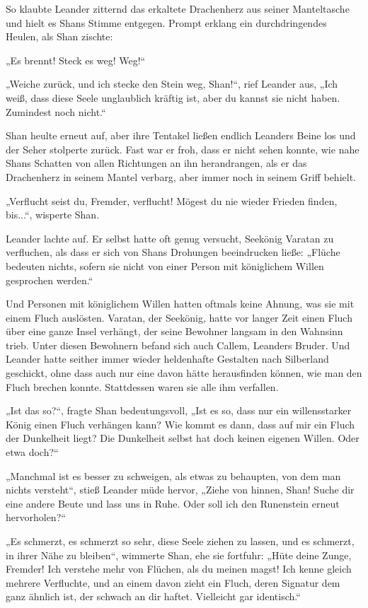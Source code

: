 So klaubte Leander zitternd das erkaltete Drachenherz aus seiner Manteltasche und hielt es Shans Stimme entgegen. Prompt erklang ein durchdringendes Heulen, als Shan zischte:

„Es brennt! Steck es weg! Weg!“

„Weiche zurück, und ich stecke den Stein weg, Shan!“, rief Leander aus, „Ich weiß, dass diese Seele unglaublich kräftig ist, aber du kannst sie nicht haben. Zumindest noch nicht.“

Shan heulte erneut auf, aber ihre Tentakel ließen endlich Leanders Beine los und der Seher stolperte zurück. Fast war er froh, dass er nicht sehen konnte, wie nahe Shans Schatten von allen Richtungen an ihn herandrangen, als er das Drachenherz in seinem Mantel verbarg, aber immer noch in seinem Griff behielt.

„Verflucht seist du, Fremder, verflucht! Mögest du nie wieder Frieden finden, bis...“, wisperte Shan.

Leander lachte auf. Er selbst hatte oft genug versucht, Seekönig Varatan zu verfluchen, als dass er sich von Shans Drohungen beeindrucken ließe: „Flüche bedeuten nichts, sofern sie nicht von einer Person mit königlichem Willen gesprochen werden.“

Und Personen mit königlichem Willen hatten oftmals keine Ahnung, was sie mit einem Fluch auslösten. Varatan, der Seekönig, hatte vor langer Zeit einen Fluch über eine ganze Insel verhängt, der seine Bewohner langsam in den Wahnsinn trieb. Unter diesen Bewohnern befand sich auch Callem, Leanders Bruder. Und Leander hatte seither immer wieder heldenhafte Gestalten nach Silberland geschickt, ohne dass auch nur eine davon hätte herausfinden können, wie man den Fluch brechen konnte. Stattdessen waren sie alle ihm verfallen.

„Ist das so?“, fragte Shan bedeutungsvoll, „Ist es so, dass nur ein willensstarker König einen Fluch verhängen kann? Wie kommt es dann, dass auf mir ein Fluch der Dunkelheit liegt? Die Dunkelheit selbst hat doch keinen eigenen Willen. Oder etwa doch?“

„Manchmal ist es besser zu schweigen, als etwas zu behaupten, von dem man nichts versteht“, stieß Leander müde hervor, „Ziehe von hinnen, Shan! Suche dir eine andere Beute und lass uns in Ruhe. Oder soll ich den Runenstein erneut hervorholen?“

„Es schmerzt, es schmerzt so sehr, diese Seele ziehen zu lassen, und es schmerzt, in ihrer Nähe zu bleiben“, wimmerte Shan, ehe sie fortfuhr: „Hüte deine Zunge, Fremder! Ich verstehe mehr von Flüchen, als du meinen magst! Ich kenne gleich mehrere Verfluchte, und an einem davon zieht ein Fluch, deren Signatur dem ganz ähnlich ist, der schwach an dir haftet. Vielleicht gar identisch.“

